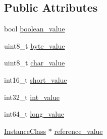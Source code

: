 \subsection*{Public Attributes}
\begin{DoxyCompactItemize}
\item 
bool \hyperlink{unionoperand__value__u_ae24e297c8249a0c4191357646a8e3769}{boolean\+\_\+value}
\item 
uint8\+\_\+t \hyperlink{unionoperand__value__u_a21b4bc4455c8e80d6044a92048e25fc8}{byte\+\_\+value}
\item 
uint8\+\_\+t \hyperlink{unionoperand__value__u_aa32123b56a07f688c63369422f3bf028}{char\+\_\+value}
\item 
int16\+\_\+t \hyperlink{unionoperand__value__u_aa25b00a9b4e1a83eb0c640c50b055bc9}{short\+\_\+value}
\item 
int32\+\_\+t \hyperlink{unionoperand__value__u_a2cf0c99efed244d66e915b663897d147}{int\+\_\+value}
\item 
int64\+\_\+t \hyperlink{unionoperand__value__u_a867f9ef828309d9781b887d12f606199}{long\+\_\+value}
\item 
\hyperlink{heap_8hpp_a10a6b663306bb9ebfa5959ab91c79eda}{Instance\+Class} $\ast$ \hyperlink{unionoperand__value__u_af760b5c7bc708eb1d4ec87a9489b57ef}{reference\+\_\+value}
\end{DoxyCompactItemize}



